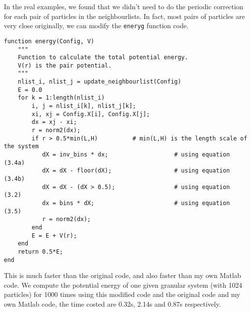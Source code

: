\documentclass[a4paper]{article}
\begin{document}
In the real examples, we found that we didn't need to do the periodic correction for each pair of particles in the neighbourlists. In fact, most pairs of particles are very close originally, we can modify the \texttt{eneryg} function code.
\begin{verbatim}
function energy(Config, V)
    """
    Function to calculate the total potential energy.
    V(r) is the pair potential.
    """
    nlist_i, nlist_j = update_neighbourlist(Config)
    E = 0.0
    for k = 1:length(nlist_i)
        i, j = nlist_i[k], nlist_j[k];
        xi, xj = Config.X[i], Config.X[j];
        dx = xj - xi;
        r = norm2(dx);    
        if r > 0.5*min(L,H)          # min(L,H) is the length scale of the system
           dX = inv_bins * dx;                   # using equation (3.4a)
           dX = dX - floor(dX);                  # using equation (3.4b)
           dX = dX - (dX > 0.5);                 # using equation (3.2)
           dx = bins * dX;                       # using equation (3.5)
           r = norm2(dx);
        end
        E = E + V(r);
    end
    return 0.5*E;
end
\end{verbatim}

This is much faster than the original code, and also faster than my own Matlab code. We compute the potential energy of one given granular system (with 1024 particles) for 1000 times using this modified code and the original code and my own Matlab code, the time costed are 0.32s, 2.14s and 0.87s respectively.
\end{document}
